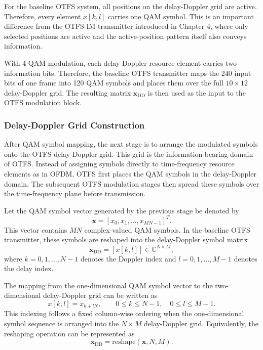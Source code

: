 For the baseline OTFS system, all positions on the delay-Doppler grid are active. Therefore, every element \(x[k,l]\) carries one QAM symbol. This is an important difference from the OTFS-IM transmitter introduced in Chapter 4, where only selected positions are active and the active-position pattern itself also conveys information.

With 4-QAM modulation, each delay-Doppler resource element carries two information bits. Therefore, the baseline OTFS transmitter maps the 240 input bits of one frame into 120 QAM symbols and places them over the full \(10 \times 12\) delay-Doppler grid. The resulting matrix \(\mathbf{x}_{\mathrm{DD}}\) is then used as the input to the OTFS modulation block.

\subsubsection{Delay-Doppler Grid Construction}

After QAM symbol mapping, the next stage is to arrange the modulated symbols onto the OTFS delay-Doppler grid. This grid is the information-bearing domain of OTFS. Instead of assigning symbols directly to time-frequency resource elements as in OFDM, OTFS first places the QAM symbols in the delay-Doppler domain. The subsequent OTFS modulation stages then spread these symbols over the time-frequency plane before transmission.

Let the QAM symbol vector generated by the previous stage be denoted by
\begin{equation}
    \mathbf{x}
    =
    [x_0,x_1,\ldots,x_{MN-1}]^T.
\end{equation}
This vector contains \(MN\) complex-valued QAM symbols. In the baseline OTFS transmitter, these symbols are reshaped into the delay-Doppler symbol matrix
\begin{equation}
    \mathbf{x}_{\mathrm{DD}}
    =
    [x[k,l]]
    \in \mathbb{C}^{N \times M},
\end{equation}
where \(k=0,1,\ldots,N-1\) denotes the Doppler index and \(l=0,1,\ldots,M-1\) denotes the delay index.

The mapping from the one-dimensional QAM symbol vector to the two-dimensional delay-Doppler grid can be written as
\begin{equation}
    x[k,l] = x_{k + lN},
    \qquad
    0 \leq k \leq N-1,\quad 0 \leq l \leq M-1.
\end{equation}
This indexing follows a fixed column-wise ordering when the one-dimensional symbol sequence is arranged into the \(N \times M\) delay-Doppler grid. Equivalently, the reshaping operation can be represented as
\begin{equation}
    \mathbf{x}_{\mathrm{DD}}
    =
    \mathrm{reshape}(\mathbf{x},N,M).
\end{equation}


